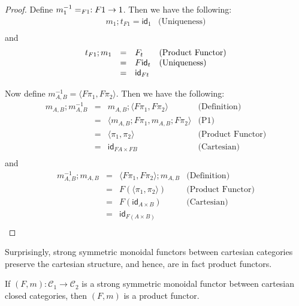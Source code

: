 \documentclass{article}
\let\mto\to
\let\to\rightarrow
\newcommand{\cat}[1]{\mathcal{#1}}
\newcommand{\id}[0]{\mathsf{id}}
\let\t\relax
\newcommand{\t}[0]{\mathsf{t}}
\begin{document}
\begin{proof}
  Define $m^{-1}_1 = \t_{F 1} : F1 \mto 1$.  Then we have the following:
  \[
  \begin{array}{lll}
    m_1;t_{F1} = \id_{1} & \text{(Uniqueness)}\\    
  \end{array}
  \]
  and
  \[
  \begin{array}{llll}
    t_{F1};m_1
    & = & F\t_t & \text{(Product Functor)}\\
    & = & F\id_t & \text{(Uniqueness)}\\
    & = & \id_{Ft}     
  \end{array}
  \]

  Now define $m^{-1}_{A,B} = \langle F\pi_1, F\pi_2 \rangle$.  Then we have the following:
  \[
  \begin{array}{llll}
    m_{A,B};m^{-1}_{A,B}
    & = & m_{A,B};\langle F\pi_1, F\pi_2 \rangle & \text{(Definition)}\\
    & = & \langle m_{A,B};F\pi_1, m_{A,B};F\pi_2 \rangle & \text{(P1)}\\
    & = & \langle \pi_1, \pi_2 \rangle & \text{(Product Functor)}\\
    & = & \id_{FA \times FB} & \text{(Cartesian)}\\
  \end{array}
  \]
  and
  \[
  \begin{array}{llll}
    m^{-1}_{A,B};m_{A,B}
    & = & \langle F\pi_1, F\pi_2 \rangle;m_{A,B} & \text{(Definition)}\\
    & = & F(\langle \pi_1, \pi_2 \rangle) & \text{(Product Functor)}\\
    & = & F(\id_{A \times B}) & \text{(Cartesian)}\\
    & = & \id_{F(A \times B)}\\    
  \end{array}
  \]
\end{proof}
\fi
\noindent
Surprisingly, strong symmetric monoidal functors between cartesian
categories preserve the cartesian structure, and hence, are in fact
product functors.  
\begin{lemma}
  \label{lemma:strong-symmetric_monoidal_functors_are_product_functors}
  If $(F,m) : \cat{C}_1 \mto \cat{C}_2$ is a strong symmetric monoidal
  functor between cartesian closed categories, then $(F,m)$ is a
  product functor.
\end{lemma}
\iffalse
\end{document}
